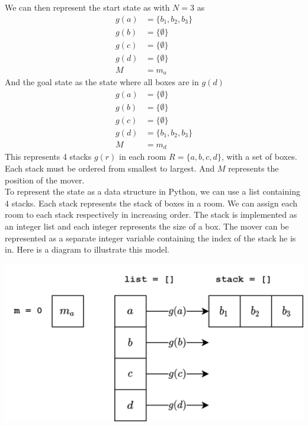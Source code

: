 \begin{enumerate}
        We can then represent the start state as with $N=3$ as
        \begin{align*}
          g(a) & = \{b_1, b_2, b_3\} \\
          g(b) & = \{\emptyset\}     \\
          g(c) & = \{\emptyset\}     \\
          g(d) & = \{\emptyset\}     \\
          M    & = m_a
        \end{align*}
        And the goal state as the state where all boxes are in $g(d)$
        \begin{align*}
          g(a) & = \{\emptyset\}     \\
          g(b) & = \{\emptyset\}     \\
          g(c) & = \{\emptyset\}     \\
          g(d) & = \{b_1, b_2, b_3\} \\
          M    & = m_d
        \end{align*}
        This represents 4 stacks $g(r)$ in each room $R = \{a, b, c, d\}$, with a set of boxes. Each stack must be ordered from smallest to largest. And $M$ represents the position of the mover.\\
        To represent the state as a data structure in Python, we can use a list containing 4 stacks. Each stack represents the stack of boxes in a room. We can assign each room to each stack respectively in increasing order. The stack is implemented as an integer list and each integer represents the size of a box. The mover can be represented as a separate integer variable containing the index of the stack he is in. Here is a diagram to illustrate this model.
        \begin{center}
          \includegraphics[scale=0.3]{"./Diagrams/Q2_DataStructure.png"}
        \end{center}

\end{enumerate}
